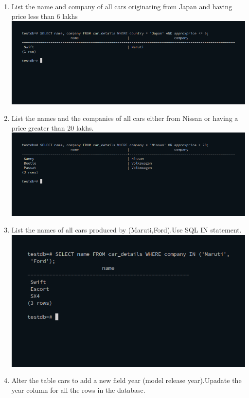 \documentclass[10pt,a4paper,titlepage]{report}
\begin{document}
{\begin{enumerate}
	\item List the name and company of all cars originating from Japan and having price less than 6 lakhs\newline
		\includegraphics[width=\linewidth]{../Images/Basics/16.png}\newline
	\item List the names and the companies of all cars either from Nissan or having a price greater than 20 lakhs.\newline
		\includegraphics[width=\linewidth]{../Images/Basics/17.png}\newline
\item List the names of all cars produced by (Maruti,Ford).Use SQL IN statement.\newline
		\includegraphics[width=\linewidth]{../Images/Basics/18.png}\newline
\item Alter the table cars to add a new field year (model release year).Upadate the year column for all the rows in the database.\newline

\end{enumerate}}
\end{document}
